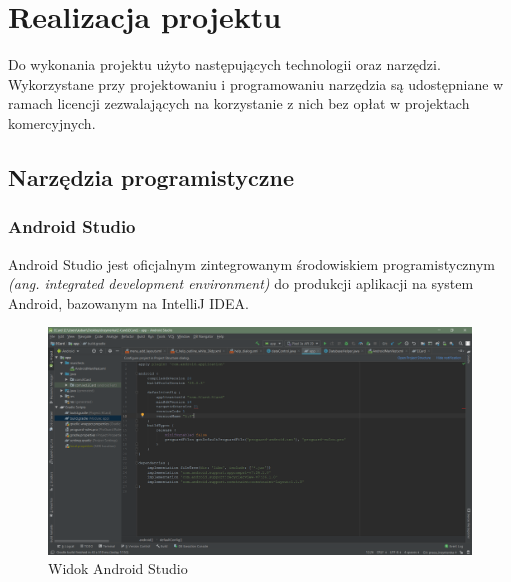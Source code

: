 \documentclass[a4paper,12pt, twoside]{article}
\begin{document}
    	\section{Realizacja projektu}
    	Do wykonania projektu użyto następujących technologii oraz narzędzi. Wykorzystane przy projektowaniu i programowaniu narzędzia są udostępniane w ramach licencji zezwalających na korzystanie z nich bez opłat w projektach komercyjnych.
    	
    	\subsection{Narzędzia programistyczne}
    	\subsubsection{Android Studio}
    	Android Studio jest oficjalnym zintegrowanym środowiskiem programistycznym \textit{(ang. integrated development environment)}\cite{ide} do produkcji aplikacji na system Android, bazowanym na IntelliJ IDEA.
    	
    	\begin{figure}[H]
    	    \centering
    		\includegraphics[width=1\textwidth]{images/rys4_android.png}
    		\caption{Widok Android Studio}
            \label{fig:androidstudio}
    	\end{figure}
    	
\end{document}
